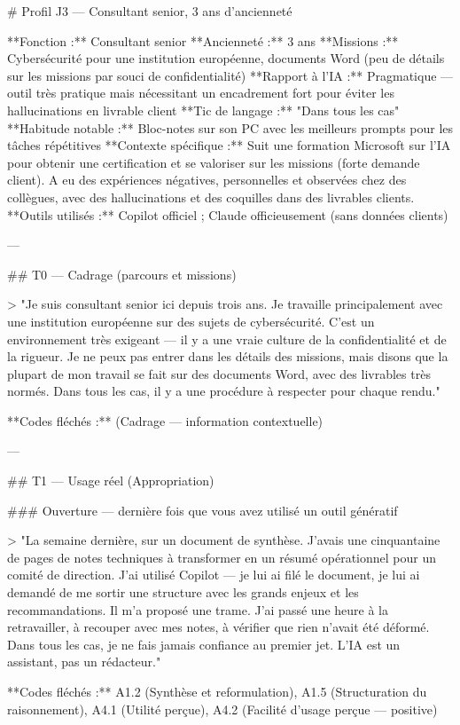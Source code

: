 # Profil J3 — Consultant senior, 3 ans d'ancienneté

**Fonction :** Consultant senior  
**Ancienneté :** 3 ans  
**Missions :** Cybersécurité pour une institution européenne, documents Word (peu de détails sur les missions par souci de confidentialité)  
**Rapport à l'IA :** Pragmatique — outil très pratique mais nécessitant un encadrement fort pour éviter les hallucinations en livrable client  
**Tic de langage :** "Dans tous les cas"  
**Habitude notable :** Bloc-notes sur son PC avec les meilleurs prompts pour les tâches répétitives  
**Contexte spécifique :** Suit une formation Microsoft sur l'IA pour obtenir une certification et se valoriser sur les missions (forte demande client). A eu des expériences négatives, personnelles et observées chez des collègues, avec des hallucinations et des coquilles dans des livrables clients.  
**Outils utilisés :** Copilot officiel ; Claude officieusement (sans données clients)

---

## T0 — Cadrage (parcours et missions)

> "Je suis consultant senior ici depuis trois ans. Je travaille principalement avec une institution européenne sur des sujets de cybersécurité. C'est un environnement très exigeant — il y a une vraie culture de la confidentialité et de la rigueur. Je ne peux pas entrer dans les détails des missions, mais disons que la plupart de mon travail se fait sur des documents Word, avec des livrables très normés. Dans tous les cas, il y a une procédure à respecter pour chaque rendu."

**Codes fléchés :** (Cadrage — information contextuelle)

---

## T1 — Usage réel (Appropriation)

### Ouverture — dernière fois que vous avez utilisé un outil génératif

> "La semaine dernière, sur un document de synthèse. J'avais une cinquantaine de pages de notes techniques à transformer en un résumé opérationnel pour un comité de direction. J'ai utilisé Copilot — je lui ai filé le document, je lui ai demandé de me sortir une structure avec les grands enjeux et les recommandations. Il m'a proposé une trame. J'ai passé une heure à la retravailler, à recouper avec mes notes, à vérifier que rien n'avait été déformé. Dans tous les cas, je ne fais jamais confiance au premier jet. L'IA est un assistant, pas un rédacteur."

**Codes fléchés :** A1.2 (Synthèse et reformulation), A1.5 (Structuration du raisonnement), A4.1 (Utilité perçue), A4.2 (Facilité d'usage perçue — positive)

